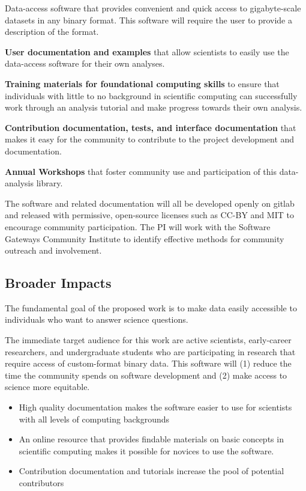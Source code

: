 Data-access software that provides convenient and quick access to gigabyte-scale datasets in any binary format.  This software will require the user to provide a description of the format.

\textbf{User documentation and examples} that allow scientists to easily use the data-access software for their own analyses.

\textbf{Training materials for foundational computing skills} to ensure that individuals with little to no background in scientific computing can successfully work through an analysis tutorial and make progress towards their own analysis.

\textbf{Contribution documentation, tests, and interface documentation} that makes it easy for the community to contribute to the project development and documentation.

\textbf{Annual Workshops} that foster community use and participation of this data-analysis library.

The software and related documentation will all be developed openly on gitlab and released with permissive, open-source licenses such as CC-BY and MIT to encourage community participation.  The PI will work with the Software Gateways Community Institute to identify effective methods for community outreach and involvement.  

\subsection{Broader Impacts}

The fundamental goal of the proposed work is to make data easily accessible to individuals who want to answer science questions.


The immediate target audience for this work are active scientists, early-career researchers, and undergraduate students who are participating in research that require access of custom-format binary data.  This software will (1) reduce the time the community spends on software development and (2) make access to science more equitable.  
\begin{itemize}
    \item High quality documentation makes the software easier to use for scientists with all levels of computing backgrounds
    \item An online resource that provides findable materials on basic concepts in scientific computing makes it possible for novices to use the software.
    \item Contribution documentation and tutorials increase the pool of potential contributors

\end{itemize}

